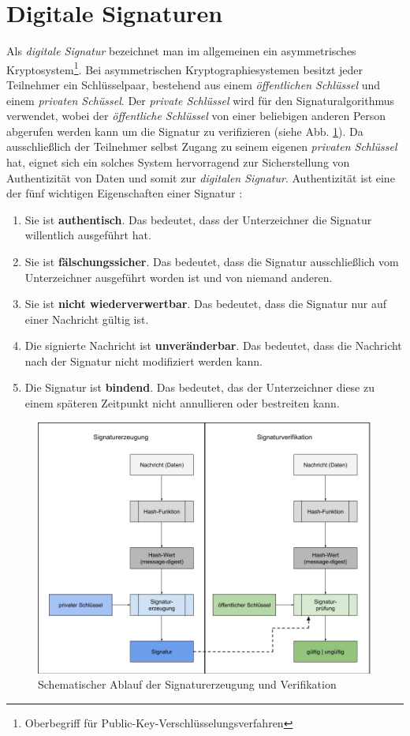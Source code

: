 \documentclass[11pt,a4paper,ngerman]{report}
\begin{document}
\section{Digitale Signaturen}
Als \textit{digitale Signatur} bezeichnet man im allgemeinen ein asymmetrisches Kryptosystem\footnote{Oberbegriff für Public-Key-Verschlüsselungsverfahren}. Bei asymmetrischen Kryptographiesystemen besitzt jeder Teilnehmer ein Schlüsselpaar, bestehend aus einem \textit{öffentlichen Schlüssel} und einem \textit{privaten Schüssel}. Der \textit{private Schlüssel} wird für den Signaturalgorithmus verwendet, wobei der \textit{öffentliche Schlüssel} von einer beliebigen anderen Person abgerufen werden kann um die Signatur zu verifizieren (siehe Abb. \ref{fig:Signaturablauf}). Da ausschließlich der Teilnehmer selbst Zugang zu seinem eigenen \textit{privaten Schlüssel} hat, eignet sich ein solches System hervorragend zur Sicherstellung von Authentizität von Daten und somit zur \textit{digitalen Signatur}. Authentizität ist eine der fünf wichtigen Eigenschaften einer Signatur \cite{sch05}:
\begin{enumerate}
    \item Sie ist \textbf{authentisch}. Das bedeutet, dass der Unterzeichner die Signatur willentlich ausgeführt hat.
    \item Sie ist \textbf{fälschungssicher}. Das bedeutet, dass die Signatur ausschließlich vom Unterzeichner ausgeführt worden ist und von niemand anderen.
    \item Sie ist \textbf{nicht wiederverwertbar}. Das bedeutet, dass die Signatur nur auf einer Nachricht gültig ist.
    \item Die signierte Nachricht ist \textbf{unveränderbar}. Das bedeutet, dass die Nachricht nach der Signatur nicht modifiziert werden kann.
    \item Die Signatur ist \textbf{bindend}. Das bedeutet, das der Unterzeichner diese zu einem späteren Zeitpunkt nicht annullieren oder bestreiten kann.
\end{enumerate}
\begin{figure}[htbp]
    \centering
        \includegraphics[width=\textwidth]{Abbildungen/Ablauf_Signatur.png}
    \caption{Schematischer Ablauf der Signaturerzeugung und Verifikation}
    \label{fig:Signaturablauf}
\end{figure}
\end{document}
